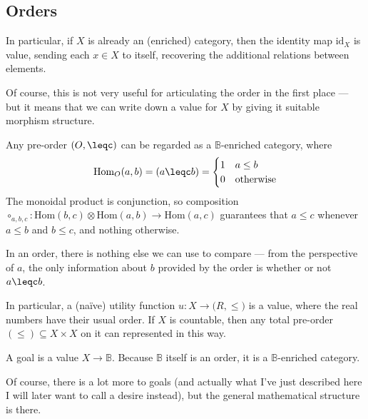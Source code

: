\documentclass{article}
\begin{document}
	\subsection{Orders}
	
	\begin{example}
		In particular, if $X$ is already an (enriched) category, then the identity map $\mathrm{id}_X$ is value, sending each $x \in X$ to itself, recovering the additional relations between elements. 
	\end{example}
	
	Of course, this is not very useful for articulating the order in the first place --- but it means that we can write down a value for $X$ by giving it suitable morphism structure.
	
	\begin{example}
		Any pre-order $(O, \leqc)$ can be regarded as a $\mathbb B$-enriched category, where 
		\[  \mathrm{Hom}_O(a,b)= (a \leqc b)  = \begin{cases}
			1 & a \leq b \\ 0 &\text{otherwise}
		\end{cases} \]
		The monoidal product is conjunction, so composition
		$ \circ_{a,b,c}: \mathrm{Hom}(b,c) \otimes \mathrm{Hom}(a,b) \to \mathrm{Hom}(a,c)$
		guarantees that $a \leq c$ whenever $a \leq b$ and $b\leq c$, and nothing otherwise.
		
		In an order, there is nothing else we can use to compare --- from the perspective of $a$, the only information about $b$ provided by the order is whether or not $a \leqc b$.
	\end{example}


	
	\begin{example}
		In particular, a (na\"ive) utility function $u: X \to \mathbb (R, \leq)$ is a value, where the real numbers have their usual order. If $X$ is countable, then any total pre-order $(\leq) \subseteq X \times X$ on it can represented in this way.
	\end{example}

	\begin{example}
		A goal is a value $X \to \mathbb B$. Because $\mathbb B$ itself is an order, it is a $\mathbb B$-enriched category. 
	\end{example}

	Of course, there is a lot more to goals (and actually what I've just described here I will later want to call a desire instead), but the general mathematical structure is there.
\end{document}
